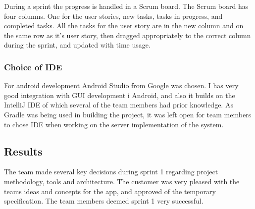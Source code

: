 During a sprint the progress is handled in a Scrum board. The Scrum board has four columns. One for the user stories, new tasks, tasks in progress, and completed tasks.
All the tasks for the user story are in the new column and on the same row as it's user story, then dragged appropriately to the correct column during the sprint, and updated with time usage.

\subsubsection{Choice of IDE}
For android development Android Studio from Google was chosen. I has very good integration with GUI development i Android, and also it builds on the IntelliJ IDE of which several of the team members had prior knowledge. As Gradle was being used in building the project, it was left open for team members to chose IDE when working on the server implementation of the system.


\subsection{Results}
The team made several key decisions during sprint 1 regarding project methodology, tools and architecture. The customer was very pleased with the teams ideas and concepts for the app, and approved of the temporary specification. The team members deemed sprint 1 very successful.